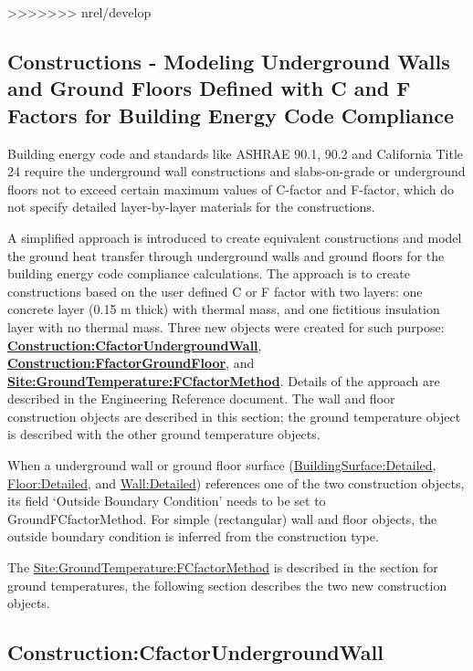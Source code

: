 >>>>>>> nrel/develop
\subsection{Constructions - Modeling Underground Walls and Ground Floors Defined with C and F Factors for Building Energy Code Compliance}\label{constructions---modeling-underground-walls-and-ground-floors-defined-with-c-and-f-factors-for-building-energy-code-compliance}

Building energy code and standards like ASHRAE 90.1, 90.2 and California Title 24 require the underground wall constructions and slabs-on-grade or underground floors not to exceed certain maximum values of C-factor and F-factor, which do not specify detailed layer-by-layer materials for the constructions.

A simplified approach is introduced to create equivalent constructions and model the ground heat transfer through underground walls and ground floors for the building energy code compliance calculations. The approach is to create constructions based on the user defined C or F factor with two layers: one concrete layer (0.15 m thick) with thermal mass, and one fictitious insulation layer with no thermal mass. Three new objects were created for such purpose: \textbf{\hyperref[constructioncfactorundergroundwall]{Construction:CfactorUndergroundWall}}, \textbf{\hyperref[constructionffactorgroundfloor]{Construction:FfactorGroundFloor}}, and \textbf{\hyperref[sitegroundtemperaturefcfactormethod]{Site:GroundTemperature:FCfactorMethod}}. Details of the approach are described in the Engineering Reference document. The wall and floor construction objects are described in this section; the ground temperature object is described with the other ground temperature objects.

When a underground wall or ground floor surface (\hyperref[buildingsurfacedetailed]{BuildingSurface:Detailed}, \hyperref[floordetailed]{Floor:Detailed}, and \hyperref[walldetailed]{Wall:Detailed}) references one of the two construction objects, its field `Outside Boundary Condition' needs to be set to GroundFCfactorMethod. For simple (rectangular) wall and floor objects, the outside boundary condition is inferred from the construction type.

The \hyperref[sitegroundtemperaturefcfactormethod]{Site:GroundTemperature:FCfactorMethod} is described in the section for ground temperatures, the following section describes the two new construction objects.

\subsection{Construction:CfactorUndergroundWall}\label{constructioncfactorundergroundwall}

